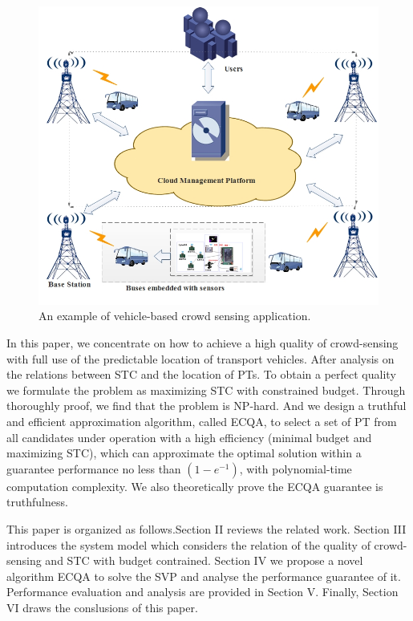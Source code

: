 \documentclass[journal]{IEEEtran}
\begin{document}
\begin{figure}[t]
	\centering
	\includegraphics[width=1.0\linewidth]{Figure1.png}
	\caption[Fig.1]{An example of vehicle-based crowd sensing application.}
	\label{Figure1}
\end{figure}

In this paper, we concentrate on how to achieve a high quality of crowd-sensing with full use of the predictable location of transport vehicles. After analysis on the relations between STC and the location of PTs. To obtain a perfect quality we formulate the problem as maximizing  STC with constrained budget. Through thoroughly proof, we find that the problem is NP-hard. And we design a truthful and efficient approximation algorithm, called ECQA, to select a set of PT from all candidates under operation with a high efficiency (minimal budget and maximizing STC), which can approximate the optimal solution within a guarantee performance no less than $\left ( 1-e^{-1} \right )$, with polynomial-time computation complexity. We also theoretically prove the ECQA guarantee is truthfulness.

This paper is organized as follows.Section II reviews the related work. Section III introduces the system model which considers the relation of the quality of crowd-sensing and STC with budget contrained. Section IV we propose a novel algorithm ECQA to solve the SVP and analyse the performance guarantee of it. Performance evaluation and analysis are provided in Section V. Finally, Section VI draws the conslusions of this paper.
\end{document}
